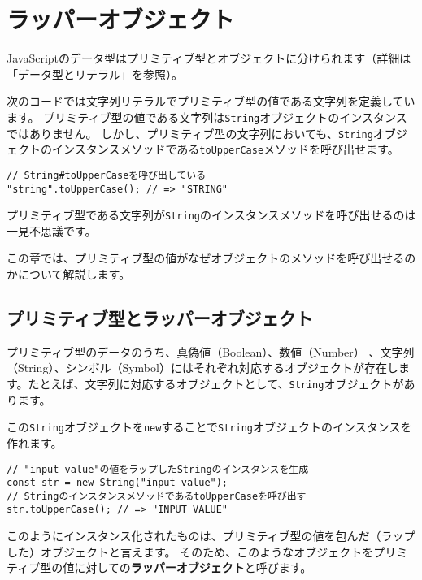 \hypertarget{wrapper-object}{%
\chapter{ラッパーオブジェクト}\label{wrapper-object}}
\thispagestyle{frontheadings}

JavaScriptのデータ型はプリミティブ型とオブジェクトに分けられます（詳細は「\hyperlink{data-type-and-literal}{データ型とリテラル}」を参照）。

次のコードでは文字列リテラルでプリミティブ型の値である文字列を定義しています。
プリミティブ型の値である文字列は\texttt{String}オブジェクトのインスタンスではありません。
しかし、プリミティブ型の文字列においても、\texttt{String}オブジェクトのインスタンスメソッドである\texttt{toUpperCase}メソッドを呼び出せます。

\begin{lstlisting}
// String#toUpperCaseを呼び出している
"string".toUpperCase(); // => "STRING"
\end{lstlisting}

プリミティブ型である文字列が\texttt{String}のインスタンスメソッドを呼び出せるのは一見不思議です。

この章では、プリミティブ型の値がなぜオブジェクトのメソッドを呼び出せるのかについて解説します。

\hypertarget{primitive-type-and-wrapper-object}{%
\section{プリミティブ型とラッパーオブジェクト}\label{primitive-type-and-wrapper-object}}

プリミティブ型のデータのうち、真偽値（Boolean）、数値（Number）
、文字列（String）、シンボル（Symbol）にはそれぞれ対応するオブジェクトが存在します。たとえば、文字列に対応するオブジェクトとして、\texttt{String}オブジェクトがあります。

この\texttt{String}オブジェクトを\texttt{new}することで\texttt{String}オブジェクトのインスタンスを作れます。

\begin{lstlisting}
// "input value"の値をラップしたStringのインスタンスを生成
const str = new String("input value");
// StringのインスタンスメソッドであるtoUpperCaseを呼び出す
str.toUpperCase(); // => "INPUT VALUE"
\end{lstlisting}

このようにインスタンス化されたものは、プリミティブ型の値を包んだ（ラップした）オブジェクトと言えます。
そのため、このようなオブジェクトをプリミティブ型の値に対しての\textbf{ラッパーオブジェクト}と呼びます。

